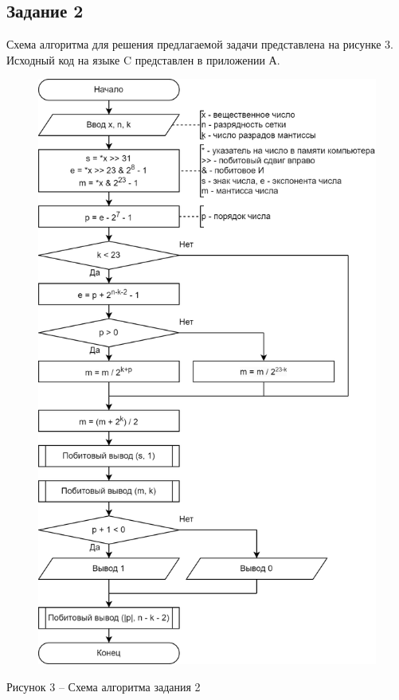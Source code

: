 \documentclass[a4paper,14pt]{extarticle}
\begin{document}
	\subsection*{Задание 2}
	Схема алгоритма для решения предлагаемой задачи представлена на рисунке 3. Исходный код на языке C представлен в приложении А.
	\begin{figure}[h]
		\centering
		\includegraphics[width=0.65\linewidth]{schemes/s-2}
	\end{figure}
	\begin{center}
		Рисунок 3 – Схема алгоритма задания 2
	\end{center}
	
	\pagebreak
\end{document}
